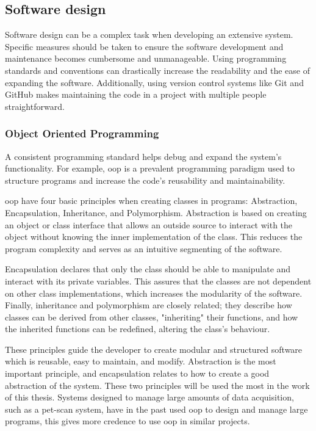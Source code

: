\documentclass[main.tex]{subfiles}
\begin{document}
\subsection{Software design}

Software design can be a complex task when developing an extensive system. Specific measures should be taken to ensure the software development and maintenance becomes cumbersome and unmanageable. Using programming standards and conventions can drastically increase the readability and the ease of expanding the software. Additionally, using version control systems like Git and GitHub makes maintaining the code in a project with multiple people straightforward.

\subsubsection{Object Oriented Programming}

A consistent programming standard helps debug and expand the system's functionality. For example, \gls{oop} is a prevalent programming paradigm used to structure programs and increase the code's reusability and maintainability.

\gls{oop} have four basic principles when creating classes in programs: Abstraction, Encapsulation, Inheritance, and Polymorphism. Abstraction is based on creating an object or class interface that allows an outside source to interact with the object without knowing the inner implementation of the class. This reduces the program complexity and serves as an intuitive segmenting of the software.

Encapsulation declares that only the class should be able to manipulate and interact with its private variables. This assures that the classes are not dependent on other class implementations, which increases the modularity of the software. Finally, inheritance and polymorphism are closely related; they describe how classes can be derived from other classes, "inheriting" their functions, and how the inherited functions can be redefined, altering the class's behaviour.


These principles guide the developer to create modular and structured software which is reusable, easy to maintain, and modify. Abstraction is the most important principle, and encapsulation relates to how to create a good abstraction of the system. These two principles will be used the most in the work of this thesis. Systems designed to manage large amounts of data acquisition, such as a \gls{pet}-scan system, have in the past used \gls{oop} to design and manage large programs\cite{pet_control_system}, this gives more credence to use \gls{oop} in similar projects.
\end{document}
